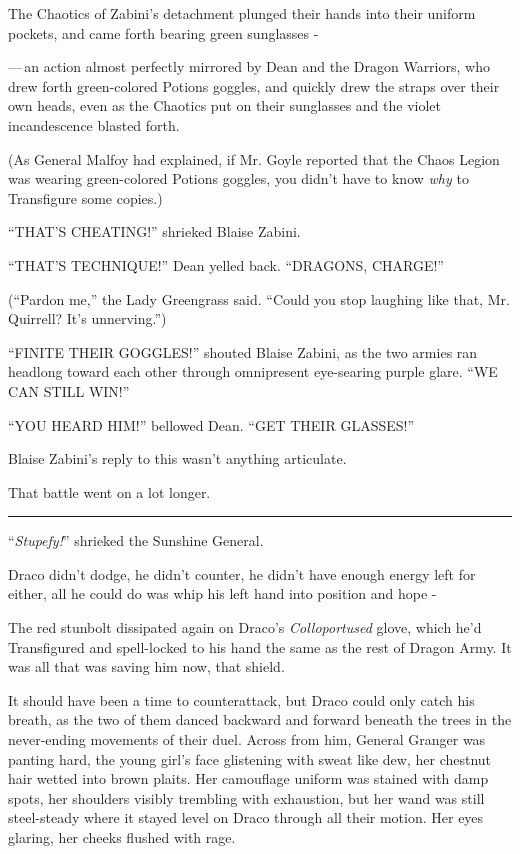 The Chaotics of Zabini's detachment plunged their hands into their uniform pockets, and came forth bearing green sunglasses -

---\,an action almost perfectly mirrored by Dean and the Dragon Warriors, who drew forth green-colored Potions goggles, and quickly drew the straps over their own heads, even as the Chaotics put on their sunglasses and the violet incandescence blasted forth.

(As General Malfoy had explained, if Mr. Goyle reported that the Chaos Legion was wearing green-colored Potions goggles, you didn't have to know \emph{why} to Transfigure some copies.)

``THAT'S CHEATING!'' shrieked Blaise Zabini.

``THAT'S TECHNIQUE!'' Dean yelled back. ``DRAGONS, CHARGE!''

(``Pardon me,'' the Lady Greengrass said. ``Could you stop laughing like that, Mr. Quirrell? It's unnerving.'')

``FINITE THEIR GOGGLES!'' shouted Blaise Zabini, as the two armies ran headlong toward each other through omnipresent eye-searing purple glare. ``WE CAN STILL WIN!''

``YOU HEARD HIM!'' bellowed Dean. ``GET THEIR GLASSES!''

Blaise Zabini's reply to this wasn't anything articulate.

That battle went on a lot longer.

\begin{center}\rule{3in}{0.4pt}\end{center}

``\emph{Stupefy!}'' shrieked the Sunshine General.

Draco didn't dodge, he didn't counter, he didn't have enough energy left for either, all he could do was whip his left hand into position and hope -

The red stunbolt dissipated again on Draco's \emph{Colloportused} glove, which he'd Transfigured and spell-locked to his hand the same as the rest of Dragon Army. It was all that was saving him now, that shield.

It should have been a time to counterattack, but Draco could only catch his breath, as the two of them danced backward and forward beneath the trees in the never-ending movements of their duel. Across from him, General Granger was panting hard, the young girl's face glistening with sweat like dew, her chestnut hair wetted into brown plaits. Her camouflage uniform was stained with damp spots, her shoulders visibly trembling with exhaustion, but her wand was still steel-steady where it stayed level on Draco through all their motion. Her eyes glaring, her cheeks flushed with rage.

